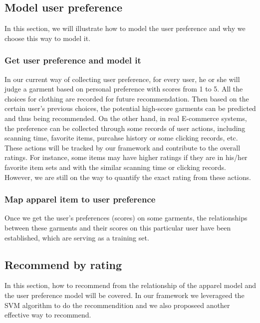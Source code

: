 \subsection{Model user preference}
In this section, we will illustrate how to model the user preference and why we choose this way to model it.

\subsubsection{Get user preference and model it}
In our current way of collecting user preference, for every user, he or she will judge a garment based on personal preference with scores from 1 to 5. All the choices for clothing are recorded for future recommendation. Then based on the certain user's previous choices, the potential high-score garments can be predicted and thus being recommended. On the other hand, in real E-commerce systems, the preference can be collected through some records of user actions, including scanning time, favorite items, purcahse history or some clicking records, etc. These actions will be tracked by our framework and contribute to the overall ratings. For instance, some items may have higher ratings if they are in his/her favorite item sets and with the similar scanning time or clicking records. However, we are still on the way to quantify the exact rating from these actions. 
  
\subsubsection{Map apparel item to user preference}
Once we get the user's preferences (scores) on some garments, the relationships between these garments and their scores on this particular user have been established, which are serving as a training set.

\subsection{Recommend by rating}
In this section, how to recommend from the relationship of the apparel model and the user preference model will be covered. In our framework we leverageed the SVM algorithm to do the recommendition and we also proposeed another effective way to recommend.

